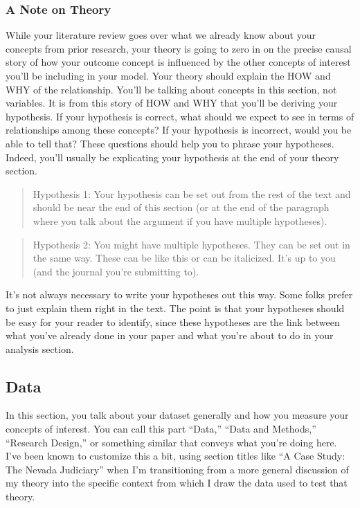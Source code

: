 \documentclass[12pt]{article}
\begin{document}
\hypertarget{a-note-on-theory}{%
\subsubsection{A Note on Theory}\label{a-note-on-theory}}

While your literature review goes over what we already know about your concepts from prior research, your theory is going to zero in on the precise causal story of how your outcome concept is influenced by the other concepts of interest you'll be including in your model. Your theory should explain the HOW and WHY of the relationship. You'll be talking about concepts in this section, not variables. It is from this story of HOW and WHY that you'll be deriving your hypothesis. If your hypothesis is correct, what should we expect to see in terms of relationships among these concepts? If your hypothesis is incorrect, would you be able to tell that? These questions should help you to phrase your hypotheses. Indeed, you'll usually be explicating your hypothesis at the end of your theory section.

\begin{quote}
Hypothesis 1: Your hypothesis can be set out from the rest of the text and should be near the end of this section (or at the end of the paragraph where you talk about the argument if you have multiple hypotheses).
\end{quote}

\begin{quote}
Hypothesis 2: You might have multiple hypotheses. They can be set out in the same way. These can be like this or can be italicized. It's up to you (and the journal you're submitting to).
\end{quote}

It's not always necessary to write your hypotheses out this way. Some folks prefer to just explain them right in the text. The point is that your hypotheses should be easy for your reader to identify, since these hypotheses are the link between what you've already done in your paper and what you're about to do in your analysis section.

\hypertarget{data}{%
\subsection{Data}\label{data}}

In this section, you talk about your dataset generally and how you measure your concepts of interest. You can call this part ``Data,'' ``Data and Methods,'' ``Research Design,'' or something similar that conveys what you're doing here. I've been known to customize this a bit, using section titles like ``A Case Study: The Nevada Judiciary'' when I'm transitioning from a more general discussion of my theory into the specific context from which I draw the data used to test that theory.
\end{document}
